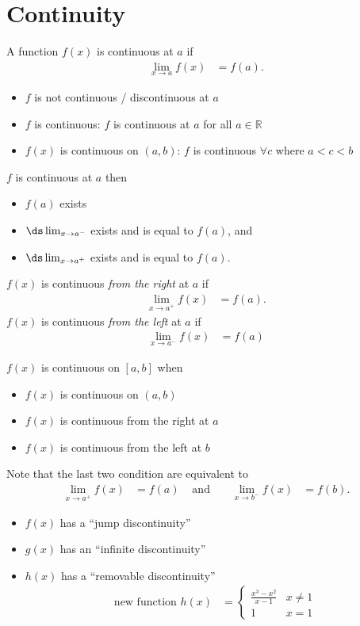 \section{Continuity}
\begin{defn}
A function $f(x)$ is continuous at $a$ if
\begin{align*}
  \lim_{x \to a} f(x) &= f(a).
\end{align*}
\begin{itemize}
  \item $f$ is not continuous / discontinuous at $a$
  \item $f$ is continuous: $f$ is continuous at $a$ for all $a \in \mathbb{R}$
  \item $f(x)$ is continuous on $(a,b)$: $f$ is continuous $\forall c$ where $a < c <b$
\end{itemize}
\end{defn}
$f$ is continuous at $a$ then
\begin{itemize}
  \item $f(a)$ exists
  \item $\ds \lim_{x \to a^-}$ exists and is equal to $f(a)$, and
  \item $\ds \lim_{x \to a^+}$ exists and is equal to $f(a)$.
\end{itemize}
\begin{defn}
$f(x)$ is continuous \emph{from the right} at $a$ if
\begin{align*}
\lim_{x\to a^+} f(x) &= f(a).
\end{align*}
$f(x)$ is continuous \emph{from the left} at $a$ if
\begin{align*}
\lim_{x\to a^-} f(x) &= f(a)
\end{align*}
\end{defn}
\begin{defn}
$f(x)$ is continuous on $[a,b]$ when
\begin{itemize}
\item $f(x)$ is continuous on $(a,b)$
\item $f(x)$ is continuous from the right at $a$
\item $f(x)$ is continuous from the left at $b$
\end{itemize}
Note that the last two condition are equivalent to
\begin{align*}
\lim_{x\to a^+} f(x) &= f(a) & \text{ and } && \lim_{x\to b^-} f(x) &= f(b).
\end{align*}
\end{defn}
\begin{itemize}
\item $f(x)$ has a ``jump discontinuity''
\item $g(x)$ has an ``infinite discontinuity''
\item $h(x)$ has a ``removable discontinuity''
\begin{align*}
\text{new function }h(x) &= \begin{cases}
\frac{x^3-x^2}{x-1} & x\neq 1\\
1 & x=1
\end{cases}
\end{align*}
\end{itemize}
